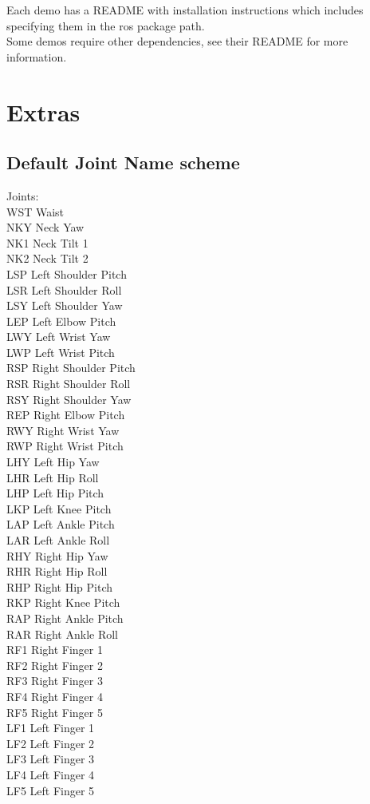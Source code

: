 \documentclass[12pt]{article}
\begin{document}
Each demo has a README with installation instructions which includes specifying them in the ros package path. \\

Some demos require other dependencies, see their README for more information. 

\section{Extras}

\subsection{Default Joint Name scheme}

Joints:\\

\noindent WST		Waist\\
NKY		Neck Yaw\\
NK1		Neck Tilt 1\\
NK2		Neck Tilt 2\\
LSP		Left Shoulder Pitch\\
LSR		Left Shoulder Roll\\
LSY		Left Shoulder Yaw\\
LEP		Left Elbow Pitch\\
LWY		Left Wrist Yaw\\
LWP		Left Wrist Pitch\\
RSP		Right Shoulder Pitch\\
RSR		Right Shoulder Roll\\
RSY		Right Shoulder Yaw\\
REP		Right Elbow Pitch\\
RWY		Right Wrist Yaw\\
RWP		Right Wrist Pitch\\
LHY		Left Hip Yaw\\
LHR		Left Hip Roll\\
LHP		Left Hip Pitch\\
LKP		Left Knee Pitch\\
LAP		Left Ankle Pitch\\
LAR		Left Ankle Roll\\
RHY		Right Hip Yaw\\
RHR		Right Hip Roll\\
RHP		Right Hip Pitch\\
RKP		Right Knee Pitch\\
RAP		Right Ankle Pitch\\
RAR		Right Ankle Roll\\
RF1		Right Finger 1\\
RF2		Right Finger 2\\
RF3		Right Finger 3\\
RF4		Right Finger 4\\
RF5		Right Finger 5\\
LF1		Left Finger 1\\
LF2		Left Finger 2\\
LF3		Left Finger 3\\
LF4		Left Finger 4\\
LF5		Left Finger 5\\
\end{document}

